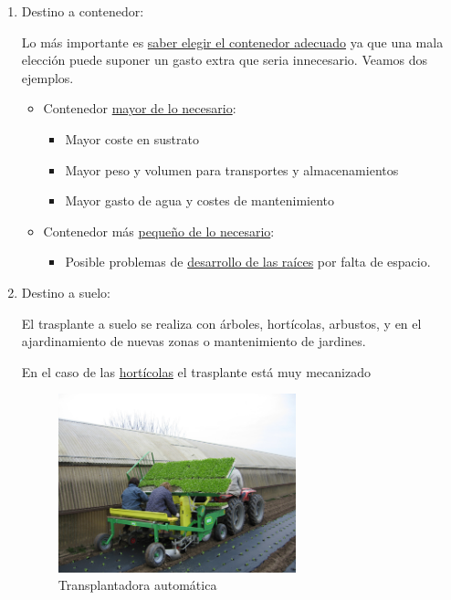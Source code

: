 \documentclass[a4paper,12pt,oneside]{article}
\begin{document}
\begin{enumerate}
\item Destino a contenedor:
\label{sec:org17328b6}

Lo más importante es \uline{saber elegir el contenedor adecuado} ya que una mala
elección puede suponer un gasto extra que seria innecesario. Veamos dos ejemplos.
\begin{itemize}
\item Contenedor \uline{mayor de lo necesario}:
\begin{itemize}
\item Mayor coste en sustrato
\item Mayor peso y volumen para transportes y almacenamientos
\item Mayor gasto de agua y costes de mantenimiento
\end{itemize}
\item Contenedor más \uline{pequeño de lo necesario}:
\begin{itemize}
\item Posible problemas de \uline{desarrollo de las raíces} por falta de espacio.
\end{itemize}
\end{itemize}

\item Destino a suelo:
\label{sec:org4e75548}

El trasplante a suelo se realiza con árboles, hortícolas, arbustos, y en el
ajardinamiento de nuevas zonas o mantenimiento de jardines.

En el caso de las \uline{hortícolas} el trasplante está muy mecanizado 
\begin{figure}[htbp]
\centering
\includegraphics[width=0.65\textwidth]{./img_uf1596/transplantadora_suelo.jpg}
\caption{Transplantadora automática}
\end{figure}


\end{enumerate}
\end{document}
